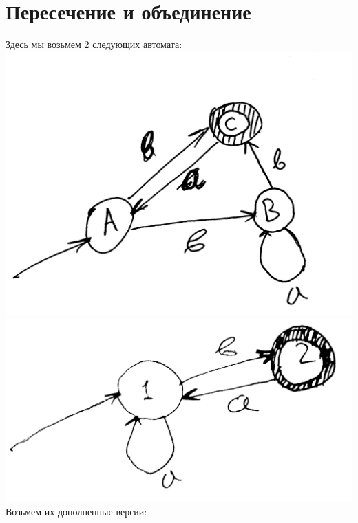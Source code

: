 \documentclass[14pt]{extreport}
\begin{document}
	\section{Пересечение и объединение}
	Здесь мы возьмем 2 следующих автомата:\\
	\includegraphics[scale=0.11]{data/pic5_1.png}\includegraphics[scale=0.11]{data/pic5_4.png}\\
	Возьмем их дополненные версии:\\
\end{document}
